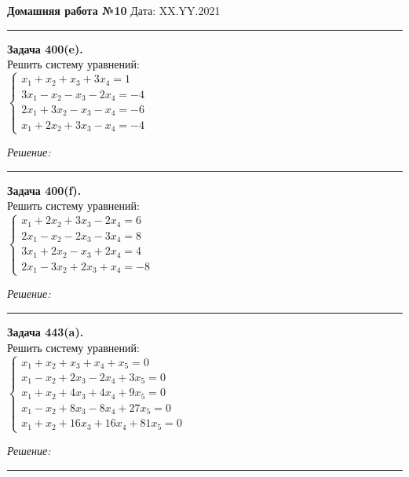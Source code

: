 \documentclass[a4paper, 12pt]{article}
\newenvironment{problem}[2][Задача]
{ \begin{mdframed}[backgroundcolor=gray!10] \textbf{#1 #2.} \\}
	{  \end{mdframed}}
\newenvironment{solution}
{\textit{Решение:}\vspace{.1cm}\\}
{\vspace{.1cm}\noindent\rule{7in}{1.5pt}}
\begin{document}
\noindent
\large\textbf{Домашняя работа №10} \hfill  Дата: XX.YY.2021  \\
\noindent\rule{7in}{2pt}

\begin{problem}{400(e)}
Решить систему уравнений:\\
$\left\{\begin{array}{l}
x_1+x_2+x_3+3x_4=1\\
3x_1-x_2-x_3-2x_4=-4\\
2x_1+3x_2-x_3-x_4=-6\\
x_1+2x_2+3x_3-x_4=-4
\end{array}\right.$

\end{problem}
\begin{solution}


\end{solution} 

\begin{problem}{400(f)}
Решить систему уравнений:\\
$\left\{\begin{array}{l}
x_1+2x_2+3x_3-2x_4=6\\
2x_1-x_2-2x_3-3x_4=8\\ 
3x_1+2x_2-x_3+2x_4=4\\
2x_1-3x_2+2x_3+x_4=-8
\end{array}\right.$

\end{problem}
\begin{solution}


\end{solution} 

\begin{problem}{443(a)}
Решить систему уравнений:\\
$\left\{\begin{array}{l}
x_1+x_2+x_3+x_4+x_5=0\\
x_1-x_2+2x_3-2x_4+3x_5=0\\
x_1+x_2+4x_3+4x_4+9x_5=0\\
x_1-x_2+8x_3-8x_4+27x_5=0\\
x_1+x_2+16x_3+16x_4+81x_5=0
\end{array}\right.$

\end{problem}
\begin{solution}


\end{solution} 
\end{document}
